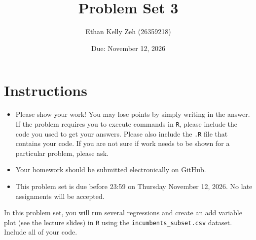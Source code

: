 \documentclass[12pt,letterpaper]{article}
\title{Problem Set 3}
\date{Due: November 12, 2026}
\author{Ethan Kelly Zeh (26359218)}
\begin{document}
	\maketitle
	\section*{Instructions}
	\begin{itemize}
		\item Please show your work! You may lose points by simply writing in the answer. If the problem requires you to execute commands in \texttt{R}, please include the code you used to get your answers. Please also include the \texttt{.R} file that contains your code. If you are not sure if work needs to be shown for a particular problem, please ask.
	\item Your homework should be submitted electronically on GitHub.
	\item This problem set is due before 23:59 on Thursday November 12, 2026. No late assignments will be accepted.

	\end{itemize}

		\vspace{.25cm}
	
\noindent In this problem set, you will run several regressions and create an add variable plot (see the lecture slides) in \texttt{R} using the \texttt{incumbents\_subset.csv} dataset. Include all of your code.

	\vspace{.5cm}
\end{document}
